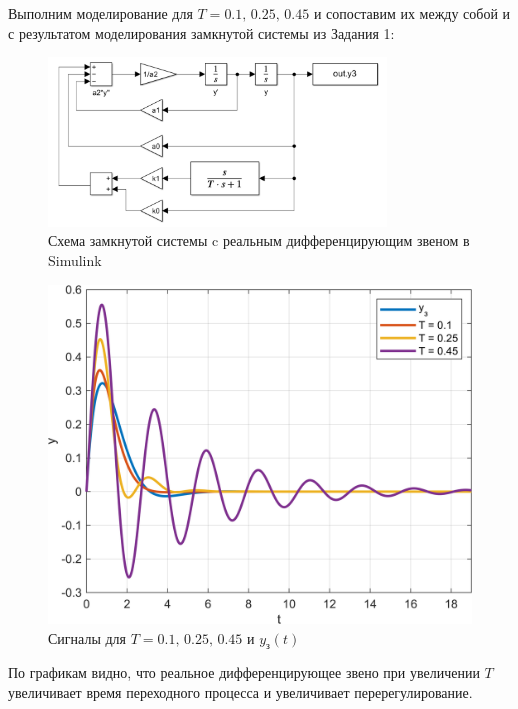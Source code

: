 Выполним моделирование для $T = 0.1,\, 0.25,\, 0.45$ и сопоставим их между собой и с 
результатом моделирования замкнутой системы из Задания 1:
\begin{figure}[H]
    \centering
    \includegraphics[width=0.8\textwidth, trim={0cm 0cm 0cm 0cm}]{../images/sim3.png}
    \caption{Схема замкнутой системы c реальным дифференцирующим звеном в Simulink}
\end{figure}
\begin{figure}[H]
    \centering
    \includegraphics[width=1\textwidth, trim={0cm 0cm 0cm 0cm}]{../images/2_1.png}
    \caption{Сигналы для $T = 0.1,\, 0.25,\, 0.45$ и $y_{\text{з}}(t)$}
\end{figure}

По графикам видно, что реальное дифференцирующее звено при увеличении $T$ 
увеличивает время переходного процесса и увеличивает перерегулирование.
\endinput